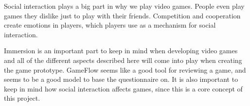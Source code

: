 Social interaction plays a big part in why we play video games. People even play games they dislike just to play with their friends. Competition and cooperation create emotions in players, which players use as a mechanism for social interaction.

Immersion is an important part to keep in mind when developing video games and all of the different aspects described here will come into play when creating the game prototype. GameFlow seems like a good tool for reviewing a game, and seems to be a good model to base the questionnaire on. It is also important to keep in mind how social interaction affects games, since this is a core concept of this project.

